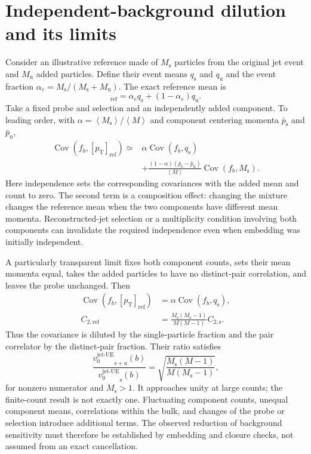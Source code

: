 \documentclass[aps,prc,twocolumn,superscriptaddress,nofootinbib,longbibliography,floatfix,10pt]{revtex4-2}
\newcommand{\vjet}{{v_0^{\mathrm{jet\text{-}UE}}}}
\newcommand{\mpt}{[p_{\mathrm T}]_{\mathrm{ref}}}
\newcommand{\av}[1]{\left\langle #1\right\rangle}
\newcommand{\Cov}{\operatorname{Cov}}
\begin{document}
\section{Independent-background dilution and its limits}\label{app:dilution}
Consider an illustrative reference made of $M_{\mathrm s}$ particles from the original jet event and $M_{\mathrm u}$ added particles. Define their event means $q_{\mathrm s}$ and $q_{\mathrm u}$ and the event fraction $\alpha_e=M_{\mathrm s}/(M_{\mathrm s}+M_{\mathrm u})$. The exact reference mean is
\begin{equation}
 \mpt=\alpha_e q_{\mathrm s}+(1-\alpha_e)q_{\mathrm u}.
 \label{eq:mixture}
\end{equation}
Take a fixed probe and selection and an independently added component. To leading order, with $\alpha=\av{M_{\mathrm s}}/\av M$ and component centering momenta $\bar p_{\mathrm s}$ and $\bar p_{\mathrm u}$,
\begin{align}
 \Cov(f_b,\mpt)\simeq{}&\alpha\Cov(f_b,q_{\mathrm s})\nonumber\\
 &+\frac{(1-\alpha)(\bar p_{\mathrm s}-\bar p_{\mathrm u})}{\av M}
 \Cov(f_b,M_{\mathrm s}).
 \label{eq:composition}
\end{align}
Here independence sets the corresponding covariances with the added mean and count to zero. The second term is a composition effect: changing the mixture changes the reference mean when the two components have different mean momenta. Reconstructed-jet selection or a multiplicity condition involving both components can invalidate the required independence even when embedding was initially independent.

A particularly transparent limit fixes both component counts, sets their mean momenta equal, takes the added particles to have no distinct-pair correlation, and leaves the probe unchanged. Then
\begin{align}
 \Cov(f_b,\mpt)&=\alpha\Cov(f_b,q_{\mathrm s}),\nonumber\\
 C_{2,\mathrm{ref}}&=\frac{M_{\mathrm s}(M_{\mathrm s}-1)}{M(M-1)}C_{2,\mathrm s}.
 \label{eq:fixeddilution}
\end{align}
Thus the covariance is diluted by the single-particle fraction and the pair correlator by the distinct-pair fraction. Their ratio satisfies
\begin{equation}
 \frac{\vjet_{\mathrm s+u}(b)}{\vjet_{\mathrm s}(b)}
 =\sqrt{\frac{M_{\mathrm s}(M-1)}{M(M_{\mathrm s}-1)}},
 \label{eq:finitecount}
\end{equation}
for nonzero numerator and $M_{\mathrm s}>1$. It approaches unity at large counts; the finite-count result is not exactly one. Fluctuating component counts, unequal component means, correlations within the bulk, and changes of the probe or selection introduce additional terms. The observed reduction of background sensitivity must therefore be established by embedding and closure checks, not assumed from an exact cancellation.
\end{document}
